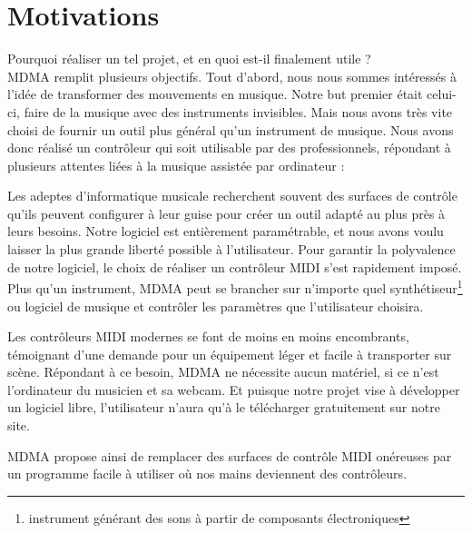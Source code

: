 \section{Motivations}
\par Pourquoi réaliser un tel projet, et en quoi est-il finalement utile ?\\
MDMA remplit plusieurs objectifs. Tout d'abord, nous nous sommes intéressés à l'idée de transformer des mouvements en musique. Notre but premier était celui-ci, faire de la musique avec des instruments invisibles. Mais nous avons très vite choisi de fournir un outil plus général qu'un instrument de musique. Nous avons donc réalisé un contrôleur qui soit utilisable par des professionnels, répondant à plusieurs attentes liées à la musique assistée par ordinateur :
\par Les adeptes d'informatique musicale recherchent souvent des surfaces de contrôle qu'ils peuvent configurer à leur guise pour créer un outil adapté au plus près à leurs besoins. Notre logiciel est entièrement paramétrable, et nous avons voulu laisser la plus grande liberté possible à l'utilisateur. Pour garantir la polyvalence de notre logiciel, le choix de réaliser un contrôleur MIDI s'est rapidement imposé. Plus qu'un instrument, MDMA peut se brancher sur n'importe quel synthétiseur\footnote{instrument générant des sons à partir de composants électroniques} ou logiciel de musique et contrôler les paramètres que  l'utilisateur choisira.
\par Les contrôleurs MIDI modernes se font de moins en moins encombrants, témoignant d'une demande pour un équipement léger et facile à transporter sur scène. Répondant à ce besoin, MDMA ne nécessite aucun matériel, si ce n'est l'ordinateur du musicien et sa webcam. Et puisque notre projet vise à développer un logiciel libre, l'utilisateur n'aura qu'à le télécharger gratuitement sur notre site.
\par MDMA propose ainsi de remplacer des surfaces de contrôle MIDI onéreuses par un programme facile à utiliser où nos mains deviennent des contrôleurs.
